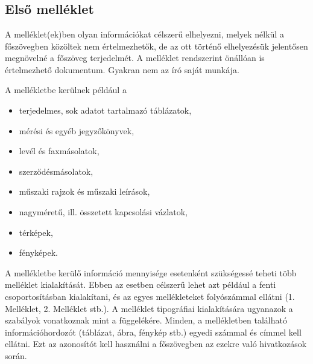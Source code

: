\appendix
\chapter*{\melleklet}
\setcounter{chapter}{\annexletter} %
\setcounter{section}{0}

\section{Első melléklet}

A melléklet(ek)ben olyan információkat célszerű elhelyezni, melyek nélkül a főszövegben közöltek nem értelmezhetők, de az ott történő elhelyezésük jelentősen megnövelné a főszöveg terjedelmét. A melléklet rendszerint önállóan is értelmezhető dokumentum. Gyakran nem az író saját munkája. 

A mellékletbe kerülnek például a
\begin{itemize}
  \item terjedelmes, sok adatot tartalmazó táblázatok,
  \item mérési és egyéb jegyzőkönyvek,
  \item levél és faxmásolatok,
  \item szerződésmásolatok,
  \item műszaki rajzok és műszaki leírások,
  \item nagyméretű, ill. összetett kapcsolási vázlatok,
  \item térképek,
  \item fényképek. 
\end{itemize}

A mellékletbe kerülő információ mennyisége esetenként szükségessé teheti több 
melléklet kialakítását. Ebben az esetben célszerű lehet azt például a fenti 
csoportosításban kialakítani, és az egyes mellékleteket folyószámmal ellátni 
(1. Melléklet, 2. Melléklet stb.).
A melléklet tipográfiai kialakítására ugyanazok a szabályok vonatkoznak mint a 
függelékére. 
Minden, a mellékletben található információhordozót (táblázat, ábra, 
fénykép stb.) egyedi számmal és címmel kell ellátni. Ezt az azonosítót kell 
használni a főszövegben az ezekre való hivatkozások során.


